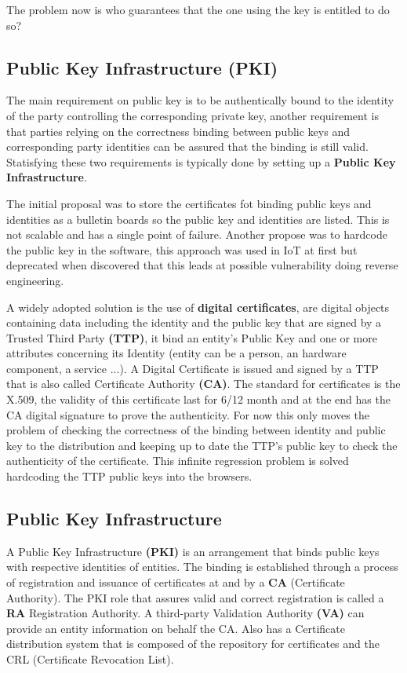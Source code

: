     \FloatBarrier
    
    The problem now is who guarantees that the one using the key is entitled to do so?
    
    \subsection{Public Key Infrastructure (PKI)}
    The main requirement on public key is to be authentically bound to the identity of the party controlling the corresponding private key, another requirement is that parties relying on the correctness binding between public keys and corresponding party identities can be assured that the binding is still valid. Statisfying these two requirements is typically done by setting up a \textbf{Public Key Infrastructure}.
    
    The initial proposal was to store the certificates fot binding public keys and identities as a bulletin boards so the public key and identities are listed. This is not scalable and has a single point of failure. Another propose was to hardcode the public key in the software, this approach was used in IoT at first but deprecated when discovered that this leads at possible vulnerability doing reverse engineering. 
    
    A widely adopted solution is the use of \textbf{digital certificates}, are digital objects containing data including the identity and the public key that are signed by a Trusted Third Party \textbf{(TTP)}, it bind an entity's Public Key and one or more attributes concerning its Identity (entity can be a person, an hardware component, a service ...). A Digital Certificate is issued and signed by a TTP that is also called Certificate Authority \textbf{(CA)}. The standard for certificates is the X.509, the validity of this certificate last for 6/12 month and at the end has the CA digital signature to prove the authenticity. For now this only moves the problem of checking the correctness of the binding between identity and public key to the distribution and keeping up to date the TTP's public key to check the authenticity of the certificate. This infinite regression problem is solved hardcoding the TTP public keys into the browsers.
    
    \subsection{Public Key Infrastructure}
    A Public Key Infrastructure \textbf{(PKI)} is an arrangement that binds public keys with respective identities of entities. The binding is established through a process of registration and issuance of certificates at and by a \textbf{CA} (Certificate Authority). The PKI role that assures valid and correct registration is called a \textbf{RA} Registration Authority. A third-party Validation Authority \textbf{(VA)} can provide an entity information on behalf the CA. Also has a Certificate distribution system that is composed of the repository for certificates and the CRL (Certificate Revocation List).
    
